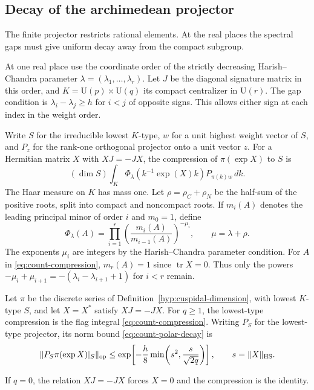 \subsection{Decay of the archimedean projector}\label{sec:count-decay}

The finite projector restricts rational elements. At the real places the spectral gaps must give uniform decay away from the compact subgroup.

At one real place use the coordinate order of the strictly decreasing
Harish--Chandra parameter \(\lambda=(\lambda_1,\ldots,\lambda_r)\).
Let \(J\) be the diagonal signature matrix in this order, and
\(K=\mathrm U(p)\times\mathrm U(q)\) its compact centralizer in
\(\mathrm U(r)\). The gap condition is
\(\lambda_i-\lambda_j\ge h\) for \(i<j\) of opposite signs.
This allows either sign at each index in the weight order.

Write \(S\) for the irreducible lowest \(K\)-type, \(w\) for a unit
highest weight vector of \(S\), and \(P_z\) for the rank-one
orthogonal projector onto a unit vector \(z\). For a Hermitian
matrix \(X\) with \(XJ=-JX\), the compression of \(\pi(\exp X)\) to
\(S\) is
\begin{equation}\label{eq:count-compression}
 (\dim S)\int_K \Phi_\lambda(k^{-1}\exp(X)k)P_{\pi(k)w}\,dk .
\end{equation}
The Haar measure on \(K\) has mass one. Let \(\rho=\rho_C+\rho_N\) be the half-sum of the positive roots,
split into compact and noncompact roots.
If \(m_i(A)\) denotes the
leading principal minor of order \(i\) and \(m_0=1\), define
\[
 \Phi_\lambda(A)=\prod_{i=1}^r \left(\frac{m_i(A)}{m_{i-1}(A)}\right)^{-\mu_i},
 \qquad \mu=\lambda+\rho.
\]
The exponents \(\mu_i\) are
integers by the Harish--Chandra parameter condition. For \(A\) in
\eqref{eq:count-compression}, \(m_r(A)=1\) since
\(\operatorname{tr} X=0\). Thus only the powers
\(-\mu_i+\mu_{i+1}=-(\lambda_i-\lambda_{i+1}+1)\) for \(i<r\) remain.

\begin{proposition}\label{prop:lowest-type-polar-decay}
Let \(\pi\) be the discrete series of
Definition~\ref{hyp:cuspidal-dimension}, with lowest \(K\)-type \(S\),
and let \(X=X^*\) satisfy \(XJ=-JX\). For \(q\ge1\), the lowest-type compression is the flag integral
\eqref{eq:count-compression}. Writing \(P_S\) for the lowest-type projector, its norm bound \eqref{eq:count-polar-decay} is 
\[
 \|P_S\pi(\exp X)|_S\|_{\rm op}\le\exp\!\left[-\frac{h}{8}\min\!\left(s^2,\frac{s}{\sqrt{2q}}\right)\right],\qquad s=\|X\|_{\rm HS}.
\]

If \(q=0\), the relation \(XJ=-JX\) forces \(X=0\) and the
compression is the identity.
\end{proposition}

